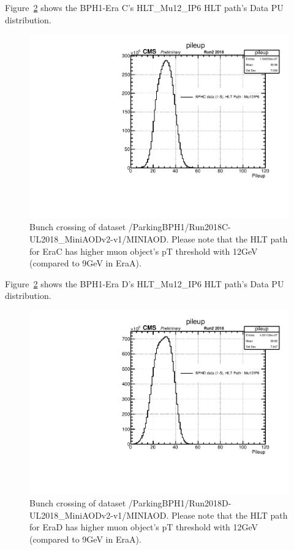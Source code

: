 Figure~\ref{fig:EraCData} shows the BPH1-Era C's HLT\_Mu12\_IP6 HLT path's Data PU distribution.
\begin{figure}[h!]
\caption{Bunch crossing of dataset /ParkingBPH1/Run2018C-UL2018\_MiniAODv2-v1/MINIAOD. Please note that the HLT path for EraC has higher muon object's pT threshold with 12GeV (compared to 9GeV in EraA).}
  \label{fig:EraCData}
  \centering
  \includegraphics[width=0.57\linewidth]{figs/NVtx_BPHC.pdf}

\end{figure}

Figure~\ref{fig:EraCData} shows the BPH1-Era D's HLT\_Mu12\_IP6 HLT path's Data PU distribution.
\begin{figure}[h!]
\caption{Bunch crossing of dataset /ParkingBPH1/Run2018D-UL2018\_MiniAODv2-v1/MINIAOD. Please note that the HLT path for EraD has higher muon object's pT threshold with 12GeV (compared to 9GeV in EraA).}
  \label{fig:EraCData}
  \centering
  \includegraphics[width=0.57\linewidth]{figs/NVtx_BPHD.pdf}

\end{figure}

